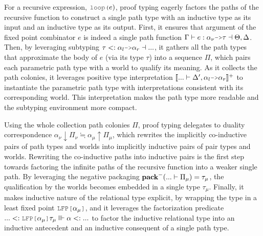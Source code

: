 \documentclass[acmsmall]{acmart}
\theoremstyle{definition}
\begin{document}
For a recursive expression, $\J{loop(}e{)}$, proof typing
eagerly factors the paths of the recursive function 
to construct a single path type with an inductive type as its input and an inductive type as its output. 
First, it ensures that argument of the fixed point combinator $e$ is indeed a 
single path function $\Gamma \entails e \hastype \alpha_\nu \J{->} \tau \given \Theta, \Delta$. 
Then, by leveraging subtyping $\tau \subtypes \alpha_l \J{->} \alpha_r \given ...$, 
it gathers all the path types that approximate the body of $e$ (via its type $\tau$)
into a sequence $\Pi$, which pairs each parametric path type with a world to qualify its meaning.
As it collects the path colonies, it leverages positive type interpretation 
$\llbracket ... \entails \Delta', \alpha_l \J{->} \alpha_r \rrbracket^+$ 
to instantiate the parametric path type with interpretations consistent with its corresponding world. 
This interpretation makes the path type more readable and the subtyping environment more compact.

Using the whole collection path colonies $\Pi$, 
proof typing delegates to duality correspondence $
      \alpha_\nu \downarrow \Pi_\nu
      \fallingdotseq 
      \alpha_\mu \uparrow \Pi_\mu
$, which rewrites the implicitly co-inductive pairs of path types and worlds into
implicitly inductive pairs of pair types and worlds. 
Rewriting the co-inductive paths into inductive pairs is the first
step towards factoring the infinite paths of the recursive function into a weaker single path.
By leveraging the negative packaging $\textbf{pack}^-(... \vdash \Pi_\mu) = \tau_\mu$,
the qualification by the worlds becomes embedded in a single type $\tau_\mu$. 
Finally, it makes inductive nature of the relational type explicit,
by wrapping the type in a least fixed point $\J{LFP[} \alpha_\mu \J{]}$, 
and it leverages the factorization predicate $... \subtypes \J{LFP[} \alpha_\mu \J{]} \tau_\mu \Vvdash \alpha \subtypes ...$
to factor the inductive relational type into an inductive antecedent and an inductive consequent
of a single path type.
\end{document}
